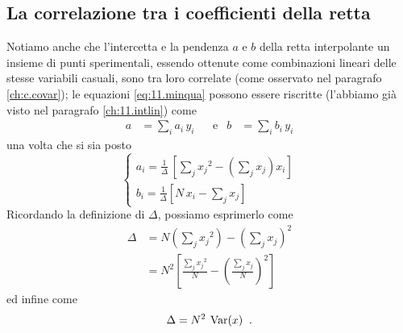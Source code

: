 \subsection{La correlazione tra i coefficienti della retta}
Notiamo anche che l'intercetta e la pendenza $a$ e $b$ della
retta interpolante un insieme di punti sperimentali, essendo
ottenute come combinazioni lineari delle stesse variabili
casuali, sono tra loro correlate (come osservato nel
paragrafo \ref{ch:c.covar}); le equazioni
\eqref{eq:11.minqua} possono essere riscritte (l'abbiamo
gi\`a visto nel paragrafo \ref{ch:11.intlin}) come
\begin{align*}
  a &= \sum\nolimits_i a_i \, y_i &&\text{e} &
  b &= \sum\nolimits_i b_i \, y_i
\end{align*}
una volta che si sia posto
\begin{equation*}
  \begin{cases}
    a_i = \displaystyle \frac{1}{\Delta} \,
      \left[ \sum\nolimits_j {x_j}^2 - \left(
      \sum\nolimits_j x_j \right) x_i \right]
      \\[3ex]
    b_i = \displaystyle \frac{1}{\Delta} \left[
      N \, x_i - \sum\nolimits_j x_j \right]
  \end{cases}
\end{equation*}
Ricordando la definizione di $\Delta$, possiamo esprimerlo
come
\begin{align*}
  \Delta &= N \left( \sum\nolimits_j {x_j}^2
    \right) - \left( \sum\nolimits_j x_j \right)^2 \\[1ex]
  &= N^2 \left[ \frac{\sum\nolimits_j {x_j}^2}{N} -
    \left( \frac{\sum\nolimits_j x_j}{N} \right)^2
    \right]
\end{align*}
ed infine come
\begin{equation} \label{eq:c.delta}
  \Delta = N^2 \: \operatorname{Var}(x) \;\; .
\end{equation}

